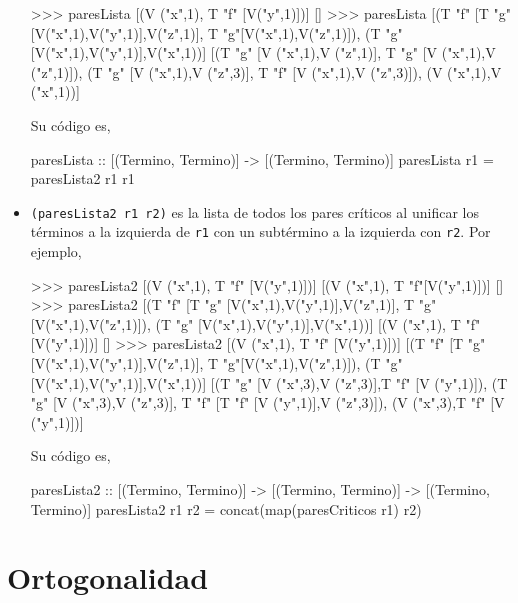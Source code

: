 \begin{itemize}
\begin{sesion}
>>> paresLista [(V ("x",1), T "f" [V("y",1)])]
[]
>>> paresLista [(T "f" [T "g" [V("x",1),V("y",1)],V("z",1)],
                 T "g"[V("x",1),V("z",1)]),
                (T "g" [V("x",1),V("y",1)],V("x",1))]
[(T "g" [V ("x",1),V ("z",1)], T "g" [V ("x",1),V ("z",1)]),
 (T "g" [V ("x",1),V ("z",3)], T "f" [V ("x",1),V ("z",3)]),
 (V ("x",1),V ("x",1))]
\end{sesion}

Su código es,

\begin{codigo}
paresLista :: [(Termino, Termino)] -> [(Termino, Termino)]
paresLista r1 = paresLista2 r1 r1
\end{codigo}

\item \texttt{(paresLista2 r1 r2)} es la lista de todos los pares
  críticos al unificar los términos a la izquierda de \texttt{r1} con un
  subtérmino a la izquierda con \texttt{r2}. Por ejemplo,

\begin{sesion}
>>> paresLista2 [(V ("x",1), T "f" [V("y",1)])]
                [(V ("x",1), T "f"[V("y",1)])]
[]
>>> paresLista2 [(T "f" [T "g" [V("x",1),V("y",1)],V("z",1)],
                  T "g"[V("x",1),V("z",1)]),
                 (T "g" [V("x",1),V("y",1)],V("x",1))]
                [(V ("x",1), T "f" [V("y",1)])] 
[]
>>> paresLista2 [(V ("x",1), T "f" [V("y",1)])] 
                [(T "f" [T "g" [V("x",1),V("y",1)],V("z",1)],
                  T "g"[V("x",1),V("z",1)]),
                  (T "g" [V("x",1),V("y",1)],V("x",1))]
[(T "g" [V ("x",3),V ("z",3)],T "f" [V ("y",1)]),
 (T "g" [V ("x",3),V ("z",3)],
  T "f" [T "f" [V ("y",1)],V ("z",3)]),
 (V ("x",3),T "f" [V ("y",1)])]
\end{sesion}

Su código es,

\begin{codigo}
paresLista2 :: [(Termino, Termino)] -> [(Termino, Termino)]
               -> [(Termino, Termino)]
paresLista2 r1 r2 = concat(map(paresCriticos r1) r2)
\end{codigo}

\end{itemize}

\section{Ortogonalidad}

